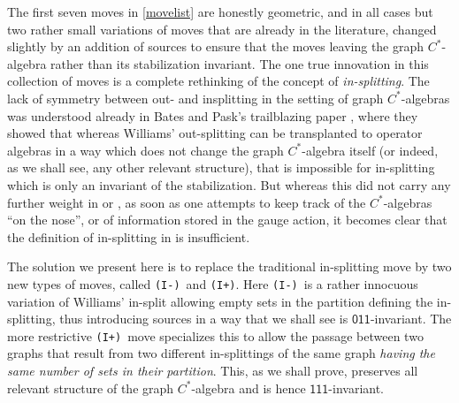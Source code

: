\documentclass[12pt]{amsbook}%
\theoremstyle{defin}
\theoremstyle{remark}
\numberwithin{equation}{chapter}
\numberwithin{theor}{section}
\newcommand{\xyz}[1]{\mbox{$\mathsf{#1}$}}
\newcommand{\IIIm}{\mbox{\texttt{\textup{(I-)}}}}
\newcommand{\IIIp}{\mbox{\texttt{\textup{(I+)}}}}
\begin{document}
The first seven moves in \eqref{movelist} are honestly geometric, and in all cases but two rather small variations of moves that are already in the literature, changed slightly by an addition of sources to ensure that the moves leaving the graph $C^*$-algebra rather than its stabilization invariant. The one true innovation in this collection of moves is a complete rethinking of the concept of \emph{in-splitting}. The lack of symmetry between out- and insplitting in the setting of graph $C^*$-algebras was understood already in Bates and Pask's trailblazing paper \cite{tbdp:fega}, where they showed that whereas Williams' out-splitting can be transplanted to operator algebras  in a way which does not change the graph $C^*$-algebra itself (or indeed, as we shall see, any other relevant structure), that is impossible for in-splitting which is only an invariant of the stabilization.
But whereas this did not carry any further weight in  \cite{tbdp:fega} or \cite{segrerapws:ccuggs}, as soon as one attempts to keep track of the $C^*$-algebras ``on the nose'', or of information stored in the gauge action, it becomes clear that the definition of in-splitting in \cite{tbdp:fega}  is insufficient.

The solution we present here is to replace the traditional in-splitting move by two new types of moves, called \IIIm\ and \IIIp. Here \IIIm\ is a rather innocuous variation of Williams' in-split allowing empty sets in the partition defining the in-splitting, thus introducing sources in a way that we shall see is \xyz{011}-invariant.  The more restrictive \IIIp\ move specializes this to allow the passage between two graphs that result from two different in-splittings of the same graph \emph{having the same number of sets in their partition}. This, as we shall prove, preserves all relevant structure of the graph $C^*$-algebra and is hence \xyz{111}-invariant.
\end{document}
